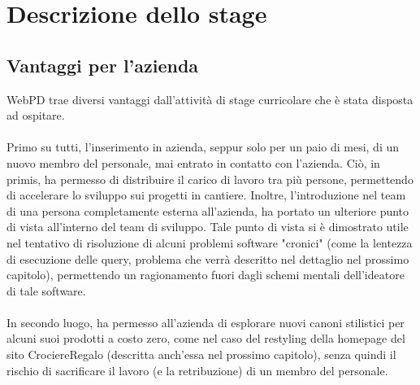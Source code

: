
\chapter{Descrizione dello stage}
\label{cap:descrizione-stage}

\section{Vantaggi per l'azienda}
WebPD trae diversi vantaggi dall'attività di stage curricolare che è stata disposta ad ospitare.\\
\\
Primo su tutti, l'inserimento in azienda, seppur solo per un paio di mesi, di un nuovo membro del personale, mai entrato in contatto con l'azienda. Ciò, in primis, ha permesso di distribuire il carico di lavoro tra più persone, permettendo di accelerare lo sviluppo sui progetti in cantiere. Inoltre, l'introduzione nel team di una persona completamente esterna all'azienda, ha portato un ulteriore punto di vista all'interno del team di sviluppo. Tale punto di vista si è dimostrato utile nel tentativo di risoluzione di alcuni problemi software "cronici" (come la lentezza di esecuzione delle query, problema che verrà descritto nel dettaglio nel prossimo capitolo), permettendo un ragionamento fuori dagli schemi mentali dell'ideatore di tale software.\\
\\
In secondo luogo, ha permesso all'azienda di esplorare nuovi canoni stilistici per alcuni suoi prodotti a costo zero, come nel caso del restyling della homepage del sito CrociereRegalo (descritta anch'essa nel prossimo capitolo), senza quindi il rischio di sacrificare il lavoro (e la retribuzione) di un membro del personale.

